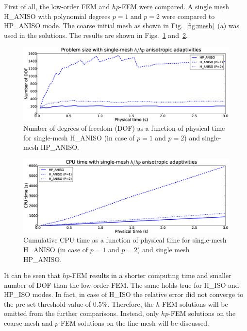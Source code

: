 First of all, the low-order FEM and $hp$-FEM were compared. A single mesh
H\_ANISO with polynomial degrees $p=1$ and $p=2$ were compared to
HP\_ANISO mode. The coarse initial mesh as shown in Fig.~\ref{fig:mesh}~(a)
was used in the solutions.
The results are shown in Figs.~\ref{fig:singlehhpdof} 
and~\ref{fig:singlehhpcpu}.
\begin{figure}[!ht]
  \begin{centering}
  \includegraphics[width=\columnwidth]{singleh_hp_dof}
  \caption{\label{fig:singlehhpdof} Number of degrees of freedom (DOF) as a function 
  of physical time for single-mesh H\_ANISO (in case of
  $p=1$ and $p=2$) and single-mesh HP\_ANISO.}
  \end{centering}
\end{figure}


\begin{figure}[!ht]
  \begin{centering}
  \includegraphics[width=\columnwidth]{singleh_hp_cpu}
  \caption{\label{fig:singlehhpcpu} Cumulative CPU time as a function 
  of physical time for single-mesh H\_ANISO (in case of $p=1$ and $p=2$)
  and single mesh HP\_ANISO.}
  \end{centering}
\end{figure}

\noindent
It can be seen that $hp$-FEM results in a shorter computing 
time and smaller number
of DOF than the low-order FEM. The same holds true
for H\_ISO and HP\_ISO modes. In fact, in case of H\_ISO the relative error did not
converge to the pre-set threshold value of $0.5\%$.
Therefore, the $h$-FEM solutions will be omitted from the further comparisons.
Instead, only $hp$-FEM solutions on the coarse mesh and $p$-FEM solutions
on the fine mesh will be discussed.

